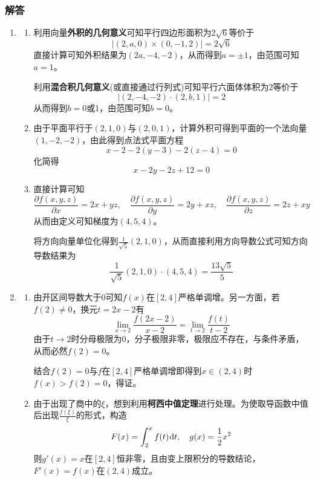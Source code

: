\documentclass[a4paper,UTF8,fontset=windows,AutoFakeBold]{ctexart}
\newcommand*{\dr}{\hspace{0.07em}\mathrm{d}}
\theoremstyle{ex}
\begin{document}
\subsubsection{解答}
\begin{enumerate}
    \item
    \begin{enumerate}
        \item 
        利用向量\textbf{外积的几何意义}可知平行四边形面积为$2\sqrt6$等价于
        $$|(2,a,0)\times(0,-1,2)|=2\sqrt6$$
        直接计算可知外积结果为$(2a,-4,-2)$，从而得到$a=\pm1$，由范围可知$a=1$。

        利用\textbf{混合积几何意义}(或直接通过行列式)可知平行六面体体积为2等价于
        $$|(2,-4,-2)\cdot(2,b,1)|=2$$
        从而得到$b=0$或1，由范围可知$b=0$。

        \item 由于平面平行于$(2,1,0)$与$(2,0,1)$，计算外积可得到平面的一个法向量$(1,-2,-2)$，由此得到点法式平面方程
        $$x-2-2(y-3)-2(z-4)=0$$
        化简得
        $$x-2y-2z+12=0$$

        \item
        直接计算可知
        $$\frac{\partial f(x,y,z)}{\partial x}=2x+yz,\quad\frac{\partial f(x,y,z)}{\partial y}=2y+xz,\quad\frac{\partial f(x,y,z)}{\partial z}=2z+xy$$
        从而由定义可知梯度为$(4,5,4)$。
        
        将方向向量单位化得到$\frac{1}{\sqrt5}(2,1,0)$，从而直接利用方向导数公式可知方向导数结果为
        $$\frac{1}{\sqrt5}(2,1,0)\cdot(4,5,4)=\frac{13\sqrt5}{5}$$
    \end{enumerate}

    \item
    \begin{enumerate}
        \item 
        由开区间导数大于0可知$f(x)$在$[2,4]$严格单调增。另一方面，若$f(2)\ne0$，换元$t=2x-2$有
        $$\lim_{x\to2}\frac{f(2x-2)}{x-2}=\lim_{t\to2}\frac{f(t)}{t-2}$$
        由于$t\to2$时分母极限为0，分子极限非零，极限应不存在，与条件矛盾，从而必然$f(2)=0$。

        结合$f(2)=0$与$f$在$[2,4]$严格单调增即得到$x\in(2,4)$时$f(x)>f(2)=0$，得证。

        \item 由于出现了商中的$\xi$，想到利用\textbf{柯西中值定理}进行处理。为使取导函数中值后出现$\frac{f(\xi)}{\xi}$的形式，构造
        $$F(x)=\int_2^xf(t)\dr t,\quad g(x)=\frac{1}{2}x^2$$
        则$g'(x)=x$在$[2,4]$恒非零，且由变上限积分的导数结论，$F'(x)=f(x)$在$(2,4)$成立。


\end{enumerate}
\end{enumerate}
\end{document}
